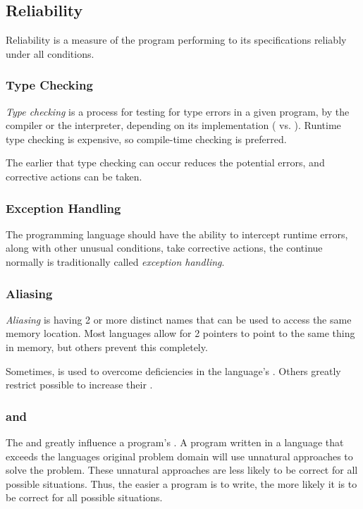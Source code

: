 \subsection{Reliability}\label{subsec:Reliability}
Reliability is a measure of the program performing to its specifications reliably under all conditions.

\subsubsection{Type Checking}\label{subsubsec:Type_Checking}
\begin{definition}\label{def:Type_Checking}
  \emph{Type checking} is a process for testing for type errors in a given program, by the compiler or the interpreter, depending on its implementation ( vs. ).
  Runtime type checking is expensive, so compile-time checking is preferred.
\end{definition}

The earlier that type checking can occur reduces the potential errors, and corrective actions can be taken.

\subsubsection{Exception Handling}\label{subsubsec:Exception_Handling}
The programming language should have the ability to intercept runtime errors, along with other unusual conditions, take corrective actions, the continue normally is traditionally called \emph{exception handling}.

\subsubsection{Aliasing}\label{subsubsec:Aliasing}
\begin{definition}[Aliasing]\label{def:Aliasing}
  \emph{Aliasing} is having 2 or more distinct names that can be used to access the same memory location.
  Most languages allow for 2 pointers to point to the same thing in memory, but others prevent this completely.
\end{definition}

Sometimes,  is used to overcome deficiencies in the language's .
Others greatly restrict possible  to increase their .

\subsubsection{ and }\label{subsubsec:Reliable_Readability_and_Writability}
The  and  greatly influence a program's .
A program written in a language that exceeds the languages original problem domain will use unnatural approaches to solve the problem.
These unnatural approaches are less likely to be correct for all possible situations.
Thus, the easier a program is to write, the more likely it is to be correct for all possible situations.

